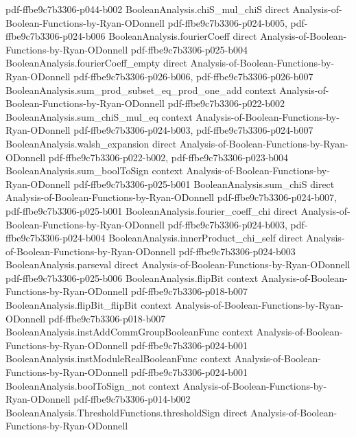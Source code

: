 \begin{lemma}
  {pdf-ffbe9c7b3306-p044-b002}
\proofstep
  {BooleanAnalysis.chiS_mul_chiS}
  {direct}
  {Analysis-of-Boolean-Functions-by-Ryan-ODonnell}
  {pdf-ffbe9c7b3306-p024-b005,
    pdf-ffbe9c7b3306-p024-b006}
\proofstep
  {BooleanAnalysis.fourierCoeff}
  {direct}
  {Analysis-of-Boolean-Functions-by-Ryan-ODonnell}
  {pdf-ffbe9c7b3306-p025-b004}
\proofstep
  {BooleanAnalysis.fourierCoeff_empty}
  {direct}
  {Analysis-of-Boolean-Functions-by-Ryan-ODonnell}
  {pdf-ffbe9c7b3306-p026-b006,
    pdf-ffbe9c7b3306-p026-b007}
\proofstep
  {BooleanAnalysis.sum_prod_subset_eq_prod_one_add}
  {context}
  {Analysis-of-Boolean-Functions-by-Ryan-ODonnell}
  {pdf-ffbe9c7b3306-p022-b002}
\proofstep
  {BooleanAnalysis.sum_chiS_mul_eq}
  {context}
  {Analysis-of-Boolean-Functions-by-Ryan-ODonnell}
  {pdf-ffbe9c7b3306-p024-b003,
    pdf-ffbe9c7b3306-p024-b007}
\proofstep
  {BooleanAnalysis.walsh_expansion}
  {direct}
  {Analysis-of-Boolean-Functions-by-Ryan-ODonnell}
  {pdf-ffbe9c7b3306-p022-b002,
    pdf-ffbe9c7b3306-p023-b004}
\proofstep
  {BooleanAnalysis.sum_boolToSign}
  {context}
  {Analysis-of-Boolean-Functions-by-Ryan-ODonnell}
  {pdf-ffbe9c7b3306-p025-b001}
\proofstep
  {BooleanAnalysis.sum_chiS}
  {direct}
  {Analysis-of-Boolean-Functions-by-Ryan-ODonnell}
  {pdf-ffbe9c7b3306-p024-b007,
    pdf-ffbe9c7b3306-p025-b001}
\proofstep
  {BooleanAnalysis.fourier_coeff_chi}
  {direct}
  {Analysis-of-Boolean-Functions-by-Ryan-ODonnell}
  {pdf-ffbe9c7b3306-p024-b003,
    pdf-ffbe9c7b3306-p024-b004}
\proofstep
  {BooleanAnalysis.innerProduct_chi_self}
  {direct}
  {Analysis-of-Boolean-Functions-by-Ryan-ODonnell}
  {pdf-ffbe9c7b3306-p024-b003}
\proofstep
  {BooleanAnalysis.parseval}
  {direct}
  {Analysis-of-Boolean-Functions-by-Ryan-ODonnell}
  {pdf-ffbe9c7b3306-p025-b006}
\proofstep
  {BooleanAnalysis.flipBit}
  {context}
  {Analysis-of-Boolean-Functions-by-Ryan-ODonnell}
  {pdf-ffbe9c7b3306-p018-b007}
\proofstep
  {BooleanAnalysis.flipBit_flipBit}
  {context}
  {Analysis-of-Boolean-Functions-by-Ryan-ODonnell}
  {pdf-ffbe9c7b3306-p018-b007}
\proofstep
  {BooleanAnalysis.instAddCommGroupBooleanFunc}
  {context}
  {Analysis-of-Boolean-Functions-by-Ryan-ODonnell}
  {pdf-ffbe9c7b3306-p024-b001}
\proofstep
  {BooleanAnalysis.instModuleRealBooleanFunc}
  {context}
  {Analysis-of-Boolean-Functions-by-Ryan-ODonnell}
  {pdf-ffbe9c7b3306-p024-b001}
\proofstep
  {BooleanAnalysis.boolToSign_not}
  {context}
  {Analysis-of-Boolean-Functions-by-Ryan-ODonnell}
  {pdf-ffbe9c7b3306-p014-b002}
\proofstep
  {BooleanAnalysis.ThresholdFunctions.thresholdSign}
  {direct}
  {Analysis-of-Boolean-Functions-by-Ryan-ODonnell}

\end{lemma}
